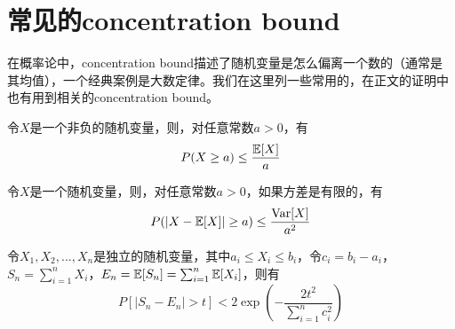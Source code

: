 
\thesisappendix

\chapter{常见的concentration bound}
在概率论中，concentration bound描述了随机变量是怎么偏离一个数的（通常是其均值），一个经典案例是大数定律。我们在这里列一些常用的，在正文的证明中也有用到相关的concentration bound。

\begin{theorem}
	令$X$是一个非负的随机变量，则，对任意常数$a>0$，有
	\begin{equation*}
		P(X \geq a) \leq \frac{\mathbb{E}[X]}{a}
	\end{equation*}
\end{theorem}

\begin{theorem}
	令$X$是一个随机变量，则，对任意常数$a>0$，如果方差是有限的，有
	\begin{equation*}
		P(|X-\mathbb{E}[X]| \geq a) \leq \frac{\text{Var}[X]}{a^{2}}
	\end{equation*}
\end{theorem}

\begin{theorem}
	令$X_1,X_2,...,X_n$是独立的随机变量，其中$a_i \leq X_i \leq b_i$，令$c_i = b_i - a_i$，$S_n = \sum_{i=1}^n X_i$，$E_n = \mathbb{E}[S_n] = \sum_{i=1}^n \mathbb{E}[X_i]$，则有
	\begin{equation*}
		P\left[\left|S_{n}-E_{n}\right|>t\right]<2 \exp \left(-\frac{2 t^{2}}{\sum_{i=1}^{n} c_{i}^{2}}\right)
	\end{equation*}
\end{theorem}